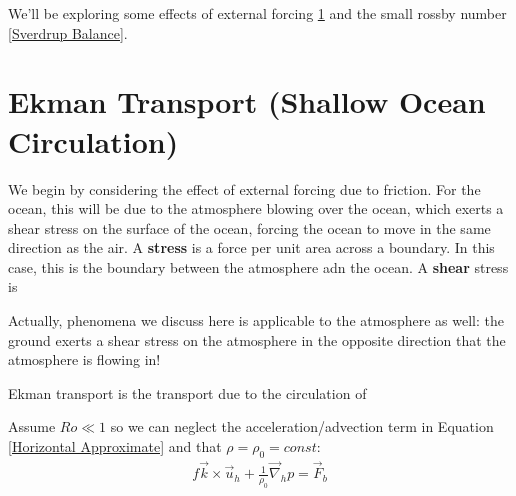 We'll be exploring some effects of external forcing \ref{Ekman Transport} and the small rossby number \ref{Sverdrup Balance}.

\section{Ekman Transport (Shallow Ocean Circulation)}\label{Ekman Transport}

We begin by considering the effect of external forcing due to friction. For the ocean, this will be due to the atmosphere blowing over the ocean, which exerts a shear stress on the surface of the ocean, forcing the ocean to move in the same direction as the air. A \textbf{stress} is a force per unit area across a boundary. In this case, this is the boundary between the atmosphere adn the ocean. A \textbf{shear} stress is 

Actually, phenomena we discuss here is applicable to the atmosphere as well: the ground exerts a shear stress on the atmosphere in the opposite direction that the atmosphere is flowing in!

Ekman transport is the transport due to the circulation of 

Assume \(Ro\ll1\) so we can neglect the acceleration/advection term in Equation \ref{Horizontal Approximate} and that \(\rho=\rho_0=const\):
\begin{align*}
    f\vec{k}\times\vec{u}_h+\frac{1}{\rho_0}\vec{\nabla}_h p = \vec{F}_b
\end{align*}

